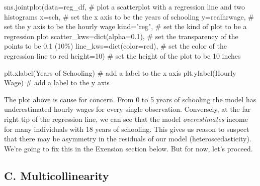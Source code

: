 \documentclass[
  letterpaper,
  DIV=11,
  numbers=noendperiod]{scrreprt}
\newenvironment{Shaded}{\begin{snugshade}}{\end{snugshade}}
\newcommand{\BuiltInTok}[1]{\textcolor[rgb]{0.00,0.23,0.31}{#1}}
\newcommand{\CommentTok}[1]{\textcolor[rgb]{0.37,0.37,0.37}{#1}}
\newcommand{\DecValTok}[1]{\textcolor[rgb]{0.68,0.00,0.00}{#1}}
\newcommand{\FloatTok}[1]{\textcolor[rgb]{0.68,0.00,0.00}{#1}}
\newcommand{\NormalTok}[1]{\textcolor[rgb]{0.00,0.23,0.31}{#1}}
\newcommand{\OperatorTok}[1]{\textcolor[rgb]{0.37,0.37,0.37}{#1}}
\newcommand{\StringTok}[1]{\textcolor[rgb]{0.13,0.47,0.30}{#1}}
\begin{document}
\begin{Shaded}
\begin{Highlighting}[]
\NormalTok{sns.jointplot(data}\OperatorTok{=}\NormalTok{reg\_df, }\CommentTok{\# plot a scatterplot with a regression line and two histograms}
\NormalTok{                x}\OperatorTok{=}\StringTok{\textquotesingle{}sch\textquotesingle{}}\NormalTok{, }\CommentTok{\# set the x axis to be the years of schooling}
\NormalTok{                y}\OperatorTok{=}\StringTok{\textquotesingle{}realhrwage\textquotesingle{}}\NormalTok{, }\CommentTok{\# set the y axis to be the hourly wage}
\NormalTok{                kind}\OperatorTok{=}\StringTok{"reg"}\NormalTok{,  }\CommentTok{\# set the kind of plot to be a regression plot}
\NormalTok{                scatter\_kws}\OperatorTok{=}\BuiltInTok{dict}\NormalTok{(alpha}\OperatorTok{=}\FloatTok{0.1}\NormalTok{), }\CommentTok{\# set the transparency of the points to be 0.1 (10\%)}
\NormalTok{                line\_kws}\OperatorTok{=}\BuiltInTok{dict}\NormalTok{(color}\OperatorTok{=}\StringTok{\textquotesingle{}red\textquotesingle{}}\NormalTok{), }\CommentTok{\# set the color of the regression line to red}
\NormalTok{                height}\OperatorTok{=}\DecValTok{10}\NormalTok{) }\CommentTok{\# set the height of the plot to be 10 inches }

\NormalTok{plt.xlabel(}\StringTok{\textquotesingle{}Years of Schooling\textquotesingle{}}\NormalTok{) }\CommentTok{\# add a label to the x axis}
\NormalTok{plt.ylabel(}\StringTok{\textquotesingle{}Hourly Wage\textquotesingle{}}\NormalTok{) }\CommentTok{\# add a label to the y axis}
\end{Highlighting}
\end{Shaded}

The plot above is cause for concern. From 0 to 5 years of schooling the
model has underestimated hourly wages for every single observation.
Conversely, at the far right tip of the regression line, we can see that
the model \emph{overestimates} income for many individuals with 18 years
of schooling. This gives us reason to suspect that there may be
asymmetry in the residuals of our model (heteroscedasticity). We're
going to fix this in the Exension section below. But for now, let's
proceed.

\hypertarget{c.-multicollinearity}{%
\subsection{C. Multicollinearity}\label{c.-multicollinearity}}
\end{document}
